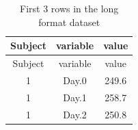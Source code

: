 \documentclass[]{article}
\theoremstyle{definition}
\theoremstyle{definition}
\theoremstyle{definition}
\theoremstyle{remark}
\begin{document}
\begin{longtable}[]{@{}ccc@{}}
\caption{First 3 rows in the long format dataset}\tabularnewline
\toprule
\begin{minipage}[b]{0.13\columnwidth}\centering\strut
Subject\strut
\end{minipage} & \begin{minipage}[b]{0.14\columnwidth}\centering\strut
variable\strut
\end{minipage} & \begin{minipage}[b]{0.09\columnwidth}\centering\strut
value\strut
\end{minipage}\tabularnewline
\midrule
\endfirsthead
\toprule
\begin{minipage}[b]{0.13\columnwidth}\centering\strut
Subject\strut
\end{minipage} & \begin{minipage}[b]{0.14\columnwidth}\centering\strut
variable\strut
\end{minipage} & \begin{minipage}[b]{0.09\columnwidth}\centering\strut
value\strut
\end{minipage}\tabularnewline
\midrule
\endhead
\begin{minipage}[t]{0.13\columnwidth}\centering\strut
1\strut
\end{minipage} & \begin{minipage}[t]{0.14\columnwidth}\centering\strut
Day.0\strut
\end{minipage} & \begin{minipage}[t]{0.09\columnwidth}\centering\strut
249.6\strut
\end{minipage}\tabularnewline
\begin{minipage}[t]{0.13\columnwidth}\centering\strut
1\strut
\end{minipage} & \begin{minipage}[t]{0.14\columnwidth}\centering\strut
Day.1\strut
\end{minipage} & \begin{minipage}[t]{0.09\columnwidth}\centering\strut
258.7\strut
\end{minipage}\tabularnewline
\begin{minipage}[t]{0.13\columnwidth}\centering\strut
1\strut
\end{minipage} & \begin{minipage}[t]{0.14\columnwidth}\centering\strut
Day.2\strut
\end{minipage} & \begin{minipage}[t]{0.09\columnwidth}\centering\strut
250.8\strut
\end{minipage}\tabularnewline
\bottomrule
\end{longtable}
\end{document}
